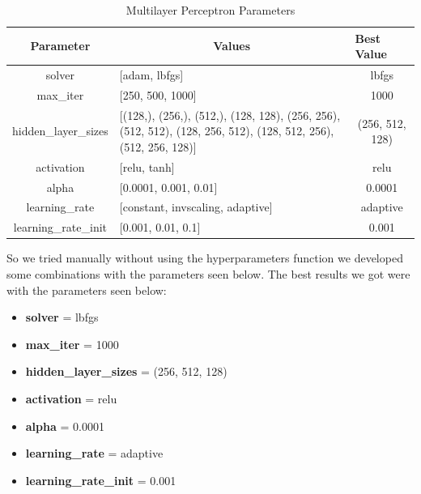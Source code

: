 \documentclass[conference]{IEEEtran}
\begin{document}
\begin{table}[!h]
    \centering
    \label{tab:mlp_parameters}
    \begin{tabular}{|c|l|c|}
    \hline
    \textbf{Parameter} & \multicolumn{1}{c|}{\textbf{Values}}     & \multicolumn{1}{l|}{\textbf{Best Value}} \\ \hline
    solver       & {[}adam, lbfgs{]}                  & lbfgs                                      \\ \hline
    max\_iter          & {[}250, 500, 1000{]}                      & 1000                                  \\ \hline
    hidden\_layer\_sizes         & {[}(128,), (256,), (512,), (128, 128), (256, 256), (512, 512), (128, 256, 512), (128, 512, 256), (512, 256, 128){]}                    & (256, 512, 128)                                     \\ \hline
    activation  & {[}relu, tanh{]}                           & relu                                   \\ \hline
    alpha   & {[}0.0001, 0.001, 0.01{]}                            & 0.0001                               \\ \hline
    learning\_rate       & {[}constant, invscaling, adaptive{]}                   & adaptive                                    \\ \hline
    learning\_rate\_init    & {[}0.001, 0.01, 0.1{]}                   & 0.001                                    \\ \hline
    \end{tabular}
    \caption{Multilayer Perceptron Parameters}
\end{table}

So we tried manually without using the hyperparameters function we developed some combinations with the parameters seen below.
The best results we got were with the parameters seen below:
\begin{itemize}
    \item \textbf{solver} = lbfgs
    \item \textbf{max\_iter} = 1000
    \item \textbf{hidden\_layer\_sizes} = (256, 512, 128)
    \item \textbf{activation} = relu
    \item \textbf{alpha} = 0.0001
    \item \textbf{learning\_rate} = adaptive
    \item \textbf{learning\_rate\_init} = 0.001
\end{itemize}
\end{document}
